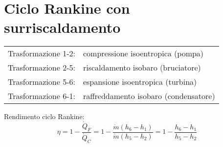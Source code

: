 \section{Ciclo Rankine con surriscaldamento}
\begin{tabular}{p{2.5cm}l}
Trasformazione 1-2: & compressione isoentropica (pompa)\\
Trasformazione 2-5: & riscaldamento isobaro (bruciatore)\\
Trasformazione 5-6: & espansione isoentropica (turbina)\\
Trasformazione 6-1: & raffreddamento isobaro (condensatore)\\
\end{tabular}

Rendimento ciclo Rankine:
\[ \eta = 1 - \frac{\dot{Q}_F}{\dot{Q}_C} = 1 - \frac{\dot{m}(h_6-h_1)}{\dot{m}(h_5-h_2)} = 1 - \frac{h_6-h_1}{h_5-h_2} \]
